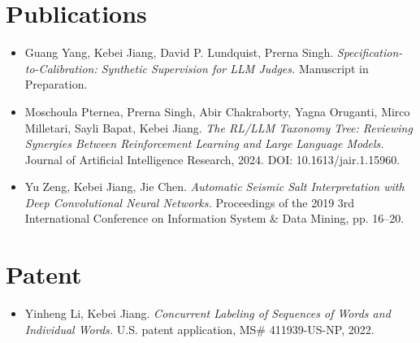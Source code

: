 \documentclass[10pt,letterpaper]{article}
\begin{document}
\section*{Publications}
\begin{itemize}
\item Guang Yang, Kebei Jiang, David P. Lundquist, Prerna Singh. \textit{Specification-to-Calibration: Synthetic Supervision for LLM Judges.} Manuscript in Preparation.
\item Moschoula Pternea, Prerna Singh, Abir Chakraborty, Yagna Oruganti, Mirco Milletari, Sayli Bapat, Kebei Jiang. \textit{The RL/LLM Taxonomy Tree: Reviewing Synergies Between Reinforcement Learning and Large Language Models.} Journal of Artificial Intelligence Research, 2024. DOI: 10.1613/jair.1.15960.
\item Yu Zeng, Kebei Jiang, Jie Chen. \textit{Automatic Seismic Salt Interpretation with Deep Convolutional Neural Networks.} Proceedings of the 2019 3rd International Conference on Information System \& Data Mining, pp. 16--20.
\end{itemize}

\section*{Patent}
\begin{itemize}
\item Yinheng Li, Kebei Jiang. \textit{Concurrent Labeling of Sequences of Words and Individual Words.} U.S. patent application, MS\# 411939-US-NP, 2022.
\end{itemize}
\end{document}
